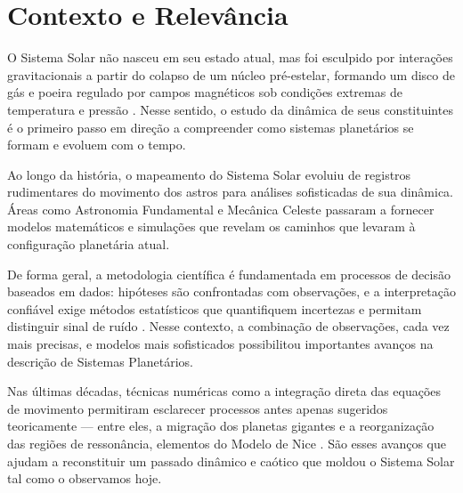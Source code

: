 \section{Contexto e Relevância}

O Sistema Solar não nasceu em seu estado atual, mas foi esculpido por interações gravitacionais a partir do colapso de um núcleo pré-estelar, formando um disco de gás e poeira regulado por campos magnéticos sob condições extremas de temperatura e pressão \citep{Morbidelli2024}. Nesse sentido, o estudo da dinâmica de seus constituintes é o primeiro passo em direção a compreender como sistemas planetários se formam e evoluem com o tempo.

Ao longo da história, o mapeamento do Sistema Solar evoluiu de registros rudimentares do movimento dos astros para análises sofisticadas de sua dinâmica. Áreas como Astronomia Fundamental e Mecânica Celeste passaram a fornecer modelos matemáticos e simulações que revelam os caminhos que levaram à configuração planetária atual. 

De forma geral, a metodologia científica é fundamentada em processos de decisão baseados em dados: hipóteses são confrontadas com observações, e a interpretação confiável exige métodos estatísticos que quantifiquem incertezas e permitam distinguir sinal de ruído \citep{Wall2003}. Nesse contexto, a combinação de observações, cada vez mais precisas, e modelos mais sofisticados possibilitou importantes avanços na descrição de Sistemas Planetários.

Nas últimas décadas, técnicas numéricas como a integração direta das equações de movimento permitiram esclarecer processos antes apenas sugeridos teoricamente --- entre eles, a migração dos planetas gigantes e a reorganização das regiões de ressonância, elementos do Modelo de Nice \citep{Tsiganis2009}. São esses avanços que ajudam a reconstituir um passado dinâmico e caótico que moldou o Sistema Solar tal como o observamos hoje. 

